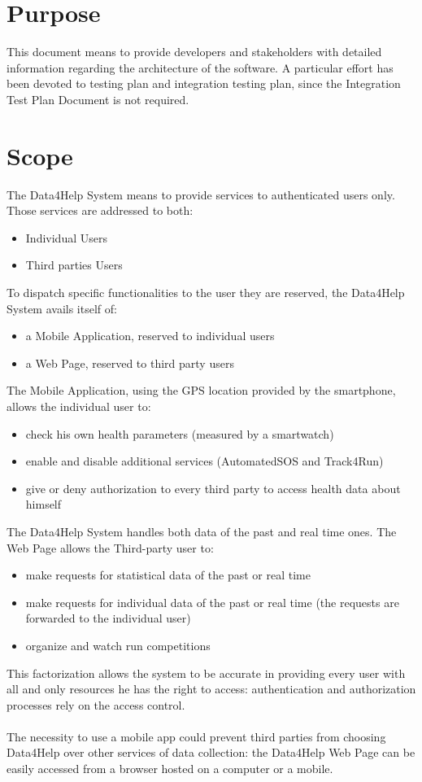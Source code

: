 \section{Purpose}
This document means to provide developers and stakeholders with detailed information regarding the architecture of the software.   
A particular effort has been devoted to testing plan and integration testing plan, since the Integration Test Plan Document is not required. 
\section{Scope}
The Data4Help System means to provide services to authenticated users only. Those services are addressed to both:
\begin{itemize}
\item	Individual Users
\item Third parties Users
\end{itemize}
To dispatch specific functionalities to the user they are reserved, the Data4Help System avails itself of:
\begin{itemize}
\item a Mobile Application, reserved to individual users
\item a Web Page, reserved to third party users
\end{itemize}
The Mobile Application, using the GPS location provided by the smartphone, allows the individual user to:
\begin{itemize}
\item check his own health parameters (measured by a smartwatch)
\item enable and disable additional services (AutomatedSOS and Track4Run)
\item give or deny authorization to every third party to access health data about himself
\end{itemize}
The Data4Help System handles both data of the past and real time ones.
The Web Page allows the Third-party user to:
\begin{itemize}
\item make requests for statistical data of the past or real time
\item make requests for individual data of the past or real time (the requests are forwarded to the individual user)
\item organize and watch run competitions
\end{itemize}
This factorization allows the system to be accurate in providing every user with all and only resources he has the right to access: authentication and authorization processes rely on the access control. \\ 
\\
The necessity to use a mobile app could prevent third parties from choosing Data4Help over other services of data collection: the Data4Help Web Page can be easily accessed from a browser hosted on a computer or a mobile. 

